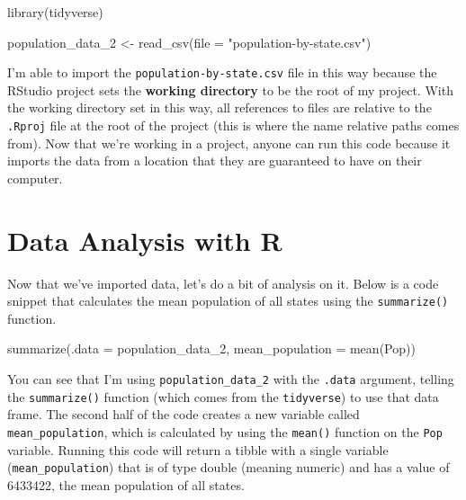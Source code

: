\documentclass[
]{book}
\newenvironment{Shaded}{\begin{snugshade}}{\end{snugshade}}
\newcommand{\AttributeTok}[1]{\textcolor[rgb]{0.77,0.63,0.00}{#1}}
\newcommand{\FunctionTok}[1]{\textcolor[rgb]{0.00,0.00,0.00}{#1}}
\newcommand{\NormalTok}[1]{#1}
\newcommand{\OtherTok}[1]{\textcolor[rgb]{0.56,0.35,0.01}{#1}}
\newcommand{\StringTok}[1]{\textcolor[rgb]{0.31,0.60,0.02}{#1}}
\begin{document}
\begin{Shaded}
\begin{Highlighting}[]
\FunctionTok{library}\NormalTok{(tidyverse)}

\NormalTok{population\_data\_2 }\OtherTok{\textless{}{-}} \FunctionTok{read\_csv}\NormalTok{(}\AttributeTok{file =} \StringTok{"population{-}by{-}state.csv"}\NormalTok{)}
\end{Highlighting}
\end{Shaded}

I'm able to import the \texttt{population-by-state.csv} file in this way because the RStudio project sets the \textbf{working directory} to be the root of my project. With the working directory set in this way, all references to files are relative to the \texttt{.Rproj} file at the root of the project (this is where the name relative paths comes from). Now that we're working in a project, anyone can run this code because it imports the data from a location that they are guaranteed to have on their computer.

\hypertarget{data-analysis-with-r}{%
\section*{Data Analysis with R}\label{data-analysis-with-r}}

Now that we've imported data, let's do a bit of analysis on it. Below is a code snippet that calculates the mean population of all states using the \texttt{summarize()} function.

\begin{Shaded}
\begin{Highlighting}[]
\FunctionTok{summarize}\NormalTok{(}\AttributeTok{.data =}\NormalTok{ population\_data\_2,}
          \AttributeTok{mean\_population =} \FunctionTok{mean}\NormalTok{(Pop))}
\end{Highlighting}
\end{Shaded}

You can see that I'm using \texttt{population\_data\_2} with the \texttt{.data} argument, telling the \texttt{summarize()} function (which comes from the \texttt{tidyverse}) to use that data frame. The second half of the code creates a new variable called \texttt{mean\_population}, which is calculated by using the \texttt{mean()} function on the \texttt{Pop} variable. Running this code will return a tibble with a single variable (\texttt{mean\_population}) that is of type double (meaning numeric) and has a value of 6433422, the mean population of all states.
\end{document}
